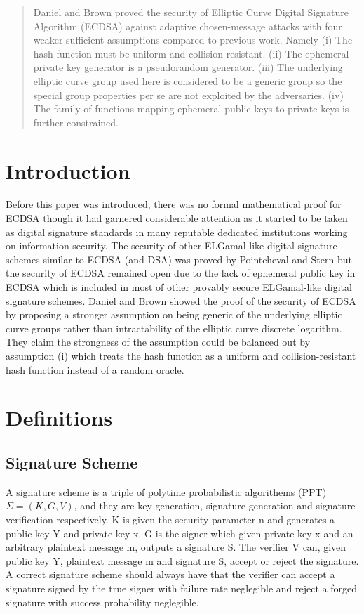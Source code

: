 \documentclass[12]{article}
\begin{document}
\maketitle

\begin{abstract}
Daniel and  Brown proved the security of Elliptic Curve Digital Signature Algorithm (ECDSA) against adaptive chosen-message attacks with four weaker sufficient assumptions compared to previous work. Namely (i) The hash function must be uniform and collision-resistant. (ii) The ephemeral private key generator is a pseudorandom generator. (iii) The underlying elliptic curve group used here is considered to be a generic group so the special group properties per se are not exploited by the adversaries. (iv) The family of functions mapping ephemeral public keys to private keys is further constrained.
\end{abstract}

\section{Introduction}
Before this paper was introduced, there was no formal mathematical proof for ECDSA though it had garnered considerable attention as it started to be taken as digital signature standards in many reputable dedicated institutions working on information security. The security of other ELGamal-like digital signature schemes similar to ECDSA (and DSA) was proved by Pointcheval and Stern but the security of ECDSA remained open due to the lack of ephemeral public key in ECDSA which is included in most of other provably secure ELGamal-like digital signature schemes. Daniel and Brown showed the proof of the security of ECDSA by proposing a stronger assumption on being generic of the underlying elliptic curve groups rather than intractability of the elliptic curve discrete logarithm. They claim the strongness of the assumption could be balanced out by assumption (i) which treats the hash function as a uniform and collision-resistant hash function instead of a random oracle.

\section{Definitions}
\subsection{Signature Scheme}
A signature scheme is a triple of polytime probabilistic algorithems (PPT)
$\Sigma=(K,G,V)$, and they are key generation, signature generation and signature verification respectively. K is given the security parameter n
and generates a public key Y and private key x.
G is the signer which given private key x and an arbitrary plaintext message m, outputs a signature S. The verifier V can,
given public key Y, plaintext message m and signature S, accept or reject the signature.
A correct signature scheme should always have that the verifier can accept a signature signed by the true signer with failure rate neglegible and reject a forged signature with success probability neglegible.
\end{document}
